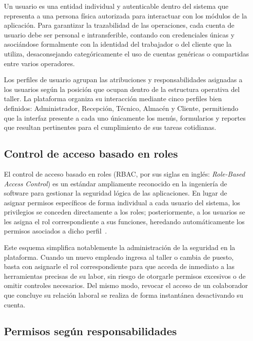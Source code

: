Un usuario es una entidad individual y autenticable dentro del sistema que representa a una persona física autorizada para interactuar con los módulos de la aplicación. Para garantizar la trazabilidad de las operaciones, cada cuenta de usuario debe ser personal e intransferible, contando con credenciales únicas y asociándose formalmente con la identidad del trabajador o del cliente que la utiliza, desaconsejando categóricamente el uso de cuentas genéricas o compartidas entre varios operadores.

Los perfiles de usuario agrupan las atribuciones y responsabilidades asignadas a los usuarios según la posición que ocupan dentro de la estructura operativa del taller. La plataforma organiza su interacción mediante cinco perfiles bien definidos: Administrador, Recepción, Técnico, Almacén y Cliente, permitiendo que la interfaz presente a cada uno únicamente los menús, formularios y reportes que resultan pertinentes para el cumplimiento de sus tareas cotidianas.

\subsection{Control de acceso basado en roles}

El control de acceso basado en roles (RBAC, por sus siglas en inglés: \textit{Role-Based Access Control}) es un estándar ampliamente reconocido en la ingeniería de software para gestionar la seguridad lógica de las aplicaciones. En lugar de asignar permisos específicos de forma individual a cada usuario del sistema, los privilegios se conceden directamente a los roles; posteriormente, a los usuarios se les asigna el rol correspondiente a sus funciones, heredando automáticamente los permisos asociados a dicho perfil~\cite{owasp_authorization}.

Este esquema simplifica notablemente la administración de la seguridad en la plataforma. Cuando un nuevo empleado ingresa al taller o cambia de puesto, basta con asignarle el rol correspondiente para que acceda de inmediato a las herramientas precisas de su labor, sin riesgo de otorgarle permisos excesivos o de omitir controles necesarios. Del mismo modo, revocar el acceso de un colaborador que concluye su relación laboral se realiza de forma instantánea desactivando su cuenta.

\subsection{Permisos según responsabilidades}

